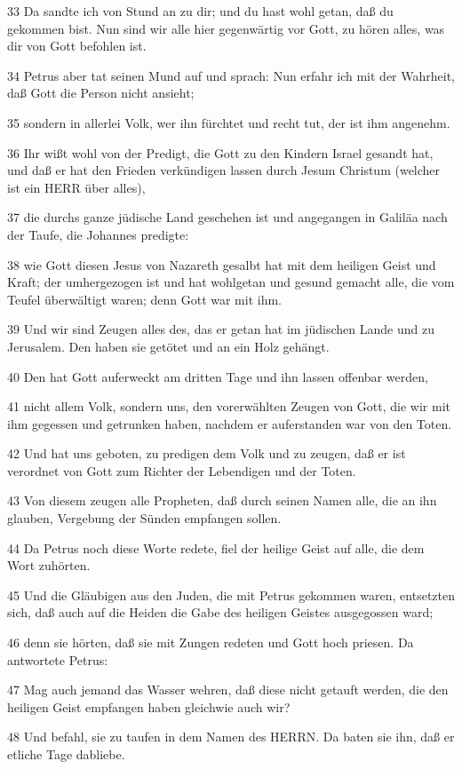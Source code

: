 \par 33 Da sandte ich von Stund an zu dir; und du hast wohl getan, daß du gekommen bist. Nun sind wir alle hier gegenwärtig vor Gott, zu hören alles, was dir von Gott befohlen ist.
\par 34 Petrus aber tat seinen Mund auf und sprach: Nun erfahr ich mit der Wahrheit, daß Gott die Person nicht ansieht;
\par 35 sondern in allerlei Volk, wer ihn fürchtet und recht tut, der ist ihm angenehm.
\par 36 Ihr wißt wohl von der Predigt, die Gott zu den Kindern Israel gesandt hat, und daß er hat den Frieden verkündigen lassen durch Jesum Christum (welcher ist ein HERR über alles),
\par 37 die durchs ganze jüdische Land geschehen ist und angegangen in Galiläa nach der Taufe, die Johannes predigte:
\par 38 wie Gott diesen Jesus von Nazareth gesalbt hat mit dem heiligen Geist und Kraft; der umhergezogen ist und hat wohlgetan und gesund gemacht alle, die vom Teufel überwältigt waren; denn Gott war mit ihm.
\par 39 Und wir sind Zeugen alles des, das er getan hat im jüdischen Lande und zu Jerusalem. Den haben sie getötet und an ein Holz gehängt.
\par 40 Den hat Gott auferweckt am dritten Tage und ihn lassen offenbar werden,
\par 41 nicht allem Volk, sondern uns, den vorerwählten Zeugen von Gott, die wir mit ihm gegessen und getrunken haben, nachdem er auferstanden war von den Toten.
\par 42 Und hat uns geboten, zu predigen dem Volk und zu zeugen, daß er ist verordnet von Gott zum Richter der Lebendigen und der Toten.
\par 43 Von diesem zeugen alle Propheten, daß durch seinen Namen alle, die an ihn glauben, Vergebung der Sünden empfangen sollen.
\par 44 Da Petrus noch diese Worte redete, fiel der heilige Geist auf alle, die dem Wort zuhörten.
\par 45 Und die Gläubigen aus den Juden, die mit Petrus gekommen waren, entsetzten sich, daß auch auf die Heiden die Gabe des heiligen Geistes ausgegossen ward;
\par 46 denn sie hörten, daß sie mit Zungen redeten und Gott hoch priesen. Da antwortete Petrus:
\par 47 Mag auch jemand das Wasser wehren, daß diese nicht getauft werden, die den heiligen Geist empfangen haben gleichwie auch wir?
\par 48 Und befahl, sie zu taufen in dem Namen des HERRN. Da baten sie ihn, daß er etliche Tage dabliebe.

